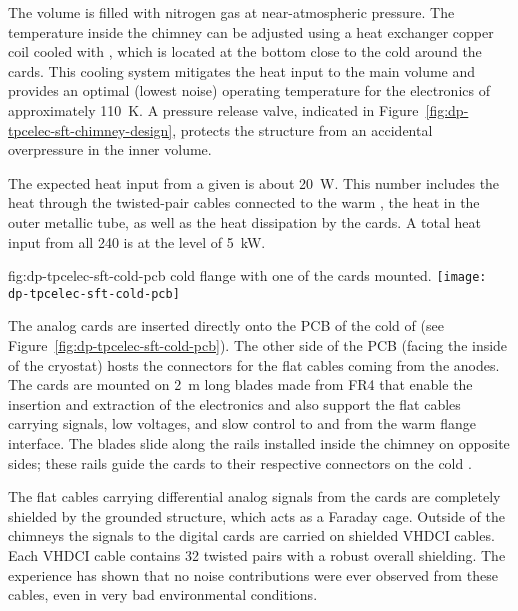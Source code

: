 The  volume is filled with nitrogen gas at near-atmospheric pressure. The temperature inside the chimney can be adjusted using a heat exchanger copper coil cooled with \lar, which is located at the bottom close to the cold \fdth around the  cards. This cooling system mitigates the heat input to the main  volume and provides an optimal (lowest noise) operating temperature for the  electronics of approximately \SI{110}{K}. A pressure release valve, indicated in Figure~\ref{fig:dp-tpcelec-sft-chimney-design}, protects the structure from an accidental overpressure in the inner volume. 

The expected heat input from a given  is about \SI{20}{\watt}. This number includes the heat through the twisted-pair cables connected to the warm \fdth, the heat in the   outer metallic tube, as well as the heat dissipation by the  cards. A total heat input from all \num{240}  is at the level of \SI{5}{\kilo\watt}. 

\begin{dunefigure}{fig:dp-tpcelec-sft-cold-pcb}
{ cold \fdth flange with one of the  cards mounted.}
\texttt{[image: dp-tpcelec-sft-cold-pcb]}
\end{dunefigure}

The analog  cards are inserted directly onto the PCB of the cold \fdth of  (see Figure~\ref{fig:dp-tpcelec-sft-cold-pcb}). The other side of the PCB (facing the inside of the cryostat) hosts the connectors for the flat cables coming from the  anodes.  The  cards are mounted on \SI{2}{\m} long blades made from FR4 that enable the insertion and extraction of the electronics and also support the flat cables carrying signals, low voltages, and slow control to and from the warm flange interface.  The blades slide along the rails installed inside the chimney on opposite sides; these rails guide the  cards to their respective connectors on the cold \fdth. 

The flat cables carrying differential analog signals from the  cards are completely shielded by the grounded  structure, which acts as a Faraday cage. Outside of the chimneys the signals to the digital cards are carried on shielded VHDCI cables. Each VHDCI cable contains \num{32} twisted pairs with a robust overall shielding. The experience has shown that no noise contributions were ever observed from these cables, even in very bad environmental conditions.

